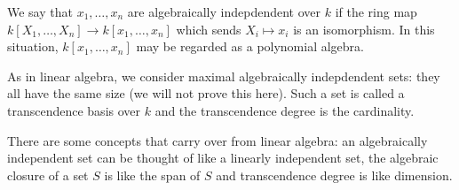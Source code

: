 We say that $x_1, \ldots, x_n$ are algebraically indepdendent over $k$ if
the ring map $k[X_1, \ldots, X_n]\to k[x_1, \ldots, x_n]$ which sends
$X_i\mapsto x_i$ is an isomorphism. In this situation, $k[x_1, \ldots, x_n]$ may
be regarded as a polynomial algebra.

As in linear algebra, we consider maximal
algebraically indepdendent sets: they all have the same size (we will not prove
this here). Such a set is called a transcendence basis over $k$ and the
transcendence degree is the cardinality.

There are some concepts that carry over
from linear algebra: an algebraically independent set can be thought of like a
linearly independent set, the algebraic closure of a set $S$ is like the span
of $S$ and transcendence degree is like dimension.
